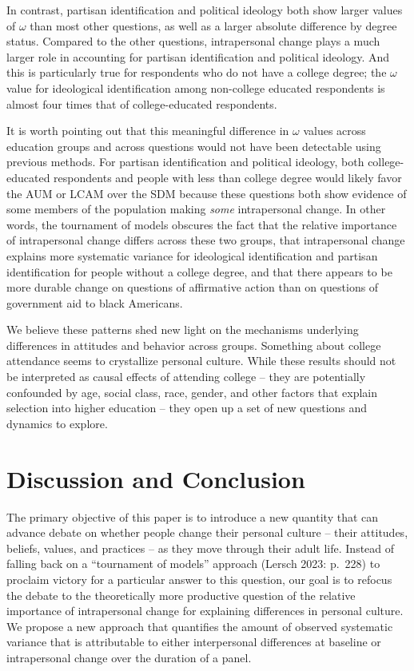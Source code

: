 \documentclass[
  12pt,
]{article}
\begin{document}
In contrast, partisan identification and political ideology both show
larger values of \(\omega\) than most other questions, as well as a
larger absolute difference by degree status. Compared to the other
questions, intrapersonal change plays a much larger role in accounting
for partisan identification and political ideology. And this is
particularly true for respondents who do not have a college degree; the
\(\omega\) value for ideological identification among non-college
educated respondents is almost four times that of college-educated
respondents.

It is worth pointing out that this meaningful difference in \(\omega\)
values across education groups and across questions would not have been
detectable using previous methods. For partisan identification and
political ideology, both college-educated respondents and people with
less than college degree would likely favor the AUM or LCAM over the SDM
because these questions both show evidence of some members of the
population making \emph{some} intrapersonal change. In other words, the
tournament of models obscures the fact that the relative importance of
intrapersonal change differs across these two groups, that intrapersonal
change explains more systematic variance for ideological identification
and partisan identification for people without a college degree, and
that there appears to be more durable change on questions of affirmative
action than on questions of government aid to black Americans.

We believe these patterns shed new light on the mechanisms underlying
differences in attitudes and behavior across groups. Something about
college attendance seems to crystallize personal culture. While these
results should not be interpreted as causal effects of attending college
-- they are potentially confounded by age, social class, race, gender,
and other factors that explain selection into higher education -- they
open up a set of new questions and dynamics to explore.

\hypertarget{discussion-and-conclusion}{%
\section{Discussion and Conclusion}\label{discussion-and-conclusion}}

The primary objective of this paper is to introduce a new quantity that
can advance debate on whether people change their personal culture --
their attitudes, beliefs, values, and practices -- as they move through
their adult life. Instead of falling back on a ``tournament of models''
approach (Lersch 2023: p.~228) to proclaim victory for a particular
answer to this question, our goal is to refocus the debate to the
theoretically more productive question of the relative importance of
intrapersonal change for explaining differences in personal culture. We
propose a new approach that quantifies the amount of observed systematic
variance that is attributable to either interpersonal differences at
baseline or intrapersonal change over the duration of a panel.
\end{document}
